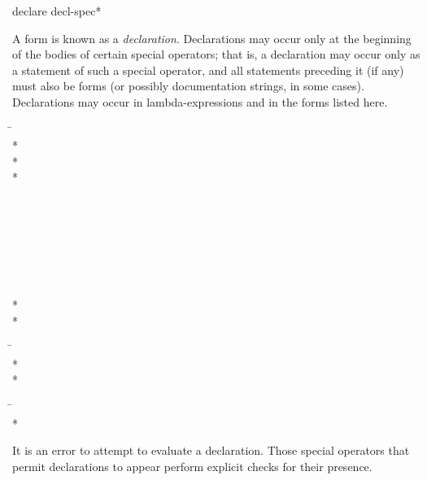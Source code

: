\begin{defspec}
declare {decl-spec}*

A  form is known as a \emph{declaration}.
Declarations may occur only at the beginning of the bodies of
certain special operators;
that is, a declaration may occur only as a statement
of such a special operator, and all statements preceding it (if any) must
also be  forms (or possibly documentation strings, in some cases).
Declarations may occur in lambda-expressions and in the forms listed here.
\begin{lisp}
\hskip 12pc\=\kill
{}\> \\*
\> \\*
\> \\*
\> \\
\> \\
\> \\
\> \\
\> \\
\> \\
\> \\
\> \\*
\> \\*
\> \\
\>
\end{lisp}
 
\begin{lisp}
\hskip 12pc\=\kill
{}\> \\*
\> \\*
\end{lisp}

\begin{lisp}
\hskip 12pc\=\kill
{}\> \\*
\end{lisp}

It is an error to attempt to evaluate a declaration.
Those special operators that permit declarations to appear
perform explicit checks for their presence.


\end{defspec}
